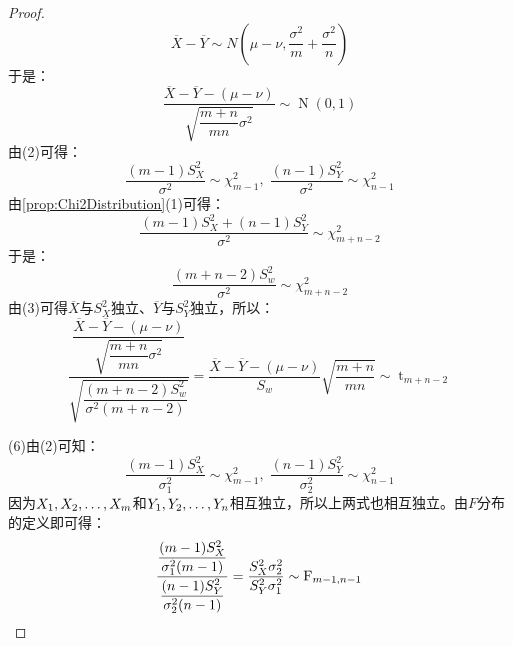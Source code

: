 \begin{proof}
\begin{equation*}
		\overline{X}-\overline{Y}\sim N\left(\mu-\nu,\frac{\sigma^2}{m}+\frac{\sigma^2}{n}\right)
	\end{equation*}
	于是：
	\begin{equation*}
		\frac{\overline{X}-\overline{Y}-(\mu-\nu)}{\sqrt{\dfrac{m+n}{mn}\sigma^2}}\sim \operatorname{N}(0,1)
	\end{equation*}
	由(2)可得：
	\begin{equation*}
		\frac{(m-1)S_X^2}{\sigma^2}\sim\chi_{m-1}^2,\;
		\frac{(n-1)S_Y^2}{\sigma^2}\sim\chi_{n-1}^2
	\end{equation*}
	由\cref{prop:Chi2Distribution}(1)可得：
	\begin{equation*}
		\frac{(m-1)S_X^2+(n-1)S_Y^2}{\sigma^2}\sim\chi_{m+n-2}^2
	\end{equation*}
	于是：
	\begin{equation*}
		\frac{(m+n-2)S_w^2}{\sigma^2}\sim\chi_{m+n-2}^2
	\end{equation*}
	由(3)可得$\overline{X}$与$S_X^2$独立、$\overline{Y}$与$S_Y^2$独立，所以：
	\begin{equation*}
		\frac{\dfrac{\overline{X}-\overline{Y}-(\mu-\nu)}{\sqrt{\dfrac{m+n}{mn}\sigma^2}}}{\sqrt{\dfrac{(m+n-2)S_w^2}{\sigma^2(m+n-2)}}}=\frac{\overline{X}-\overline{Y}-(\mu-\nu)}{S_w}\sqrt{\dfrac{m+n}{mn}}\sim \operatorname{t}_{m+n-2}
	\end{equation*}\par
	(6)由(2)可知：
	\begin{equation*}
		\frac{(m-1)S_X^2}{\sigma_1^2}\sim\chi_{m-1}^2,\;
		\frac{(n-1)S_Y^2}{\sigma_2^2}\sim\chi_{n-1}^2
	\end{equation*}
	因为$X_1, X_2, \dots, X_{m}$和$Y_1, Y_2, \dots, Y_{n}$相互独立，所以上两式也相互独立。由$F$分布的定义即可得：
	\begin{equation*}
		\frac{\dfrac{(m-1)S_X^2}{\sigma_1^2(m-1)}}{\dfrac{(n-1)S_Y^2}{\sigma_2^2(n-1)}}=\frac{S_X^2\sigma_2^2}{S_Y^2\sigma_1^2}\sim \operatorname{F}_{m-1,n-1}\qedhere
	\end{equation*}
\end{proof}

